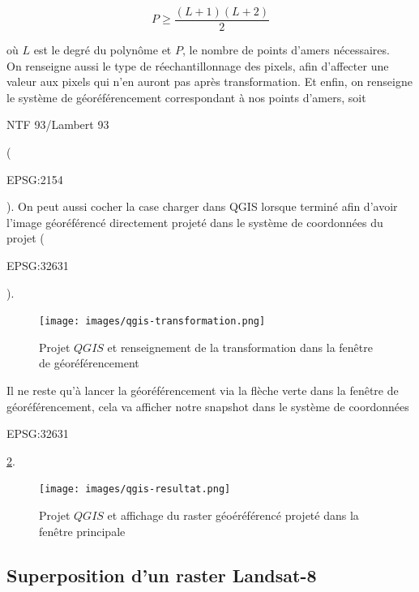 \documentclass{book}
\begin{document}
\[P\ge\frac{(L+1)(L+2)}{2}\]

où $L$ est le degré du polyn\^{o}me et $P$, le nombre de points d'amers nécessaires.\\
On renseigne aussi le type de réechantillonnage des pixels, afin d'affecter une valeur aux pixels qui n'en auront pas
après transformation. Et enfin, on renseigne le système de géoréférencement correspondant 
à nos points d'amers, soit \begin{itshape}NTF 93/Lambert 93\end{itshape} (\begin{itshape}EPSG:2154\end{itshape}). On peut aussi
 cocher la case \og charger dans QGIS lorsque terminé \fg{} afin d'avoir l'image géoréférencé directement
 projeté dans le système de coordonnées du projet (\begin{itshape}EPSG:32631\end{itshape}).

\begin{figure}[H]
\begin{center}
\texttt{[image: images/qgis-transformation.png]}
\end{center}
\caption{Projet $QGIS$ et renseignement de la transformation dans la fen\^{e}tre de géoréférencement}
\label{qgis-transformation}
\end{figure}

\clearpage

Il ne reste qu'à lancer la géoréférencement via la flèche verte dans la fen\^{e}tre de géoréférencement, cela va afficher
notre snapshot dans le système de coordonnées \begin{itshape}EPSG:32631\end{itshape} \ref{qgis-resultat}.

\begin{figure}[H]
\begin{center}
\texttt{[image: images/qgis-resultat.png]}
\end{center}
\caption{Projet $QGIS$ et affichage du raster géoéréférencé projeté dans la fen\^{e}tre principale}
\label{qgis-resultat}
\end{figure}

\clearpage

\subsection{Superposition d'un raster Landsat-8}
\end{document}
